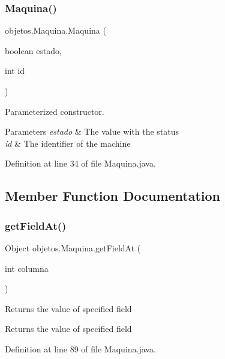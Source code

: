 \subsubsection{\texorpdfstring{Maquina()}{Maquina()}}
{\footnotesize\ttfamily objetos.\+Maquina.\+Maquina (\begin{DoxyParamCaption}\item[{boolean}]{estado,  }\item[{int}]{id }\end{DoxyParamCaption})}

Parameterized constructor.


\begin{DoxyParams}{Parameters}
{\em estado} & The value with the status \\
\hline
{\em id} & The identifier of the machine \\
\hline
\end{DoxyParams}


Definition at line 34 of file Maquina.\+java.



\subsection{Member Function Documentation}
\mbox{\label{classobjetos_1_1_maquina_ab50c4dec88d2de79313a9a369df0ffd3}} 
\subsubsection{\texorpdfstring{get\+Field\+At()}{getFieldAt()}}
{\footnotesize\ttfamily Object objetos.\+Maquina.\+get\+Field\+At (\begin{DoxyParamCaption}\item[{int}]{columna }\end{DoxyParamCaption})}

Returns the value of specified field

\begin{DoxyReturn}{Returns}
the value of specified field 
\end{DoxyReturn}


Definition at line 89 of file Maquina.\+java.

\mbox{\label{classobjetos_1_1_maquina_a8ecfb51ac52f34402a48c572aa710297}} 
